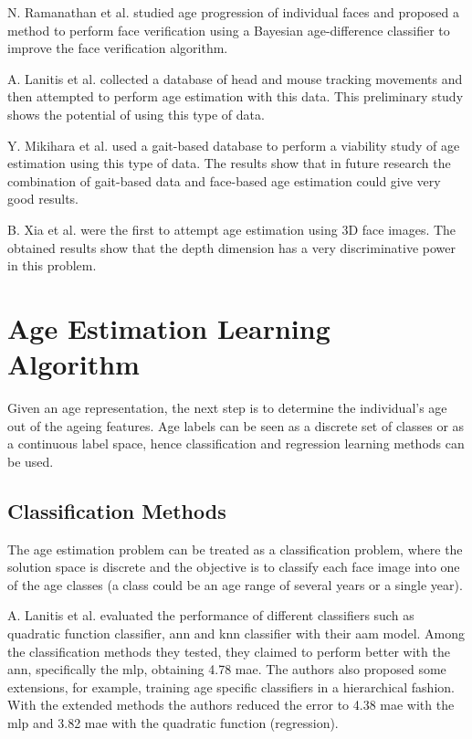 N. Ramanathan et al. \cite{1709980} studied age progression of individual faces and proposed a method to perform face verification using a Bayesian age-difference classifier to improve the face verification algorithm.

A. Lanitis et al. \cite{5463396} collected a database of head and mouse tracking movements and then attempted to perform age estimation with this data. This preliminary study shows the potential of using this type of data.

Y. Mikihara et al. \cite{6117531} used a gait-based database to perform a viability study of age estimation using this type of data. The results show that in future research the combination of gait-based data and face-based age estimation could give very good results.

B. Xia et al. \cite{xia:hal-00904007} were the first to attempt age estimation using 3D face images. The obtained results show that the depth dimension has a very discriminative power in this problem. 

\section{Age Estimation Learning Algorithm}
Given an age representation, the next step is to determine the individual's age out of the ageing features. Age labels can be seen as a discrete set of classes or as a continuous label space, hence classification and regression learning methods can be used.

\subsection{Classification Methods}

The age estimation problem can be treated as a classification problem, where the solution space is discrete and the objective is to classify each face image into one of the age classes (a class could be an age range of several years or a single year).

A. Lanitis et al. \cite{Lanitis:2004:CDC:2225304.2226166} evaluated the performance of different classifiers such as quadratic function classifier, \gls{ann} and \gls{knn} classifier with their \gls{aam} model. Among the classification methods they tested, they claimed to perform better with the \gls{ann}, specifically the \gls{mlp}, obtaining 4.78 \gls{mae}. The authors also proposed some extensions, for example, training age specific classifiers in a hierarchical fashion. With the extended methods the authors reduced the error to 4.38 \gls{mae} with the \gls{mlp} and 3.82 \gls{mae} with the quadratic function (regression).

